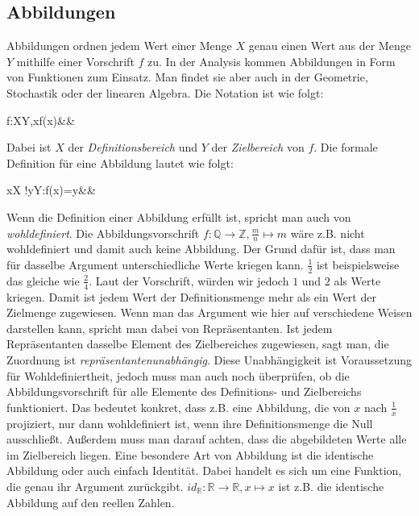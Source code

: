 \documentclass[12pt]{article}
\begin{document}
	\subsection{Abbildungen}
	\label{subsec:abbildungen}
		Abbildungen ordnen jedem Wert einer Menge $X$ genau einen Wert aus der Menge $Y$ mithilfe einer Vorschrift $f$ zu. In der Analysis kommen Abbildungen in Form von Funktionen zum Einsatz. Man findet sie aber auch in der Geometrie, Stochastik oder der linearen Algebra. Die Notation ist wie folgt:
		\begin{flalign*}
			f:X\rightarrow Y,x\mapsto f(x)&&
		\end{flalign*}
		Dabei ist $X$ der \textit{Definitionsbereich} und $Y$ der \textit{Zielbereich} von $f$.\newline\newline
		Die formale Definition für eine Abbildung lautet wie folgt:
		\begin{flalign*}
			\forall x\in X \exists!y\in Y:f(x)=y&&
		\end{flalign*}
		Wenn die Definition einer Abbildung erfüllt ist, spricht man auch von \textit{wohldefiniert}. Die Abbildungsvorschrift $f:\mathbb{Q}\rightarrow\mathbb{Z},\frac{m}{n}\mapsto m$ wäre z.B. nicht wohldefiniert und damit auch keine Abbildung. Der Grund dafür ist, dass man für dasselbe Argument unterschiedliche Werte kriegen kann. $\frac{1}{2}$ ist beispielsweise das gleiche wie $\frac{2}{4}$. Laut der Vorschrift, würden wir jedoch $1$ und $2$ als Werte kriegen. Damit ist jedem Wert der Definitionsmenge mehr als ein Wert der Zielmenge zugewiesen. Wenn man das Argument wie hier auf verschiedene Weisen darstellen kann, spricht man dabei von Repräsentanten. Ist jedem Repräsentanten dasselbe Element des Zielbereiches zugewiesen, sagt man, die Zuordnung ist \textit{repräsentantenunabhängig}. Diese Unabhängigkeit ist Voraussetzung für Wohldefiniertheit, jedoch muss man auch noch überprüfen, ob die Abbildungsvorschrift für alle Elemente des Definitions- und Zielbereichs funktioniert. Das bedeutet konkret, dass z.B. eine Abbildung, die von $x$ nach $\frac{1}{x}$ projiziert, nur dann wohldefiniert ist, wenn ihre Definitionsmenge die Null ausschließt. Außerdem muss man darauf achten, dass die abgebildeten Werte alle im Zielbereich liegen.\newline\newline
		Eine besondere Art von Abbildung ist die identische Abbildung oder auch einfach Identität. Dabei handelt es sich um eine Funktion, die genau ihr Argument zurückgibt. $id_{\mathbb{R}}:\mathbb{R}\rightarrow\mathbb{R},x\mapsto x$ ist z.B. die identische Abbildung auf den reellen Zahlen.
\end{document}
